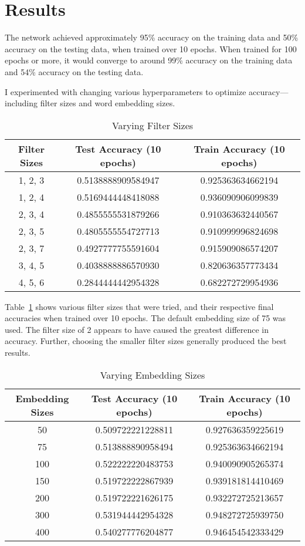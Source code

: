 \documentclass{article}
\begin{document}
\section{Results}
The network achieved approximately 95\% accuracy on the training data and 50\% accuracy on the testing data, when trained over 10 epochs. When trained
for 100 epochs or more, it would converge to around 99\% accuracy on the training data and 54\% accuracy on the testing data.

I experimented with changing various hyperparameters to optimize accuracy—including filter sizes and word embedding sizes.

\begin{table}[b]
  \caption{Varying Filter Sizes}
  \label{tab:filter_sizes}
  \centering
  \begin{tabular}{ccc}
    \toprule
    Filter Sizes & Test Accuracy (10 epochs) & Train Accuracy (10 epochs) \\
    \midrule
    1, 2, 3 & 0.5138888909584947 & 0.925363634662194 \\
    1, 2, 4 & 0.5169444448418088 & 0.936090906099839 \\
    2, 3, 4 & 0.4855555531879266 & 0.910363632440567 \\
    2, 3, 5 & 0.4805555554727713 & 0.910999996824698 \\
    2, 3, 7 & 0.4927777755591604 & 0.915909086574207 \\
    3, 4, 5 & 0.4038888886570930 & 0.820636357773434 \\
    4, 5, 6 & 0.2844444442954328 & 0.682272729954936 \\
    \bottomrule
  \end{tabular}
\end{table}

Table~\ref{tab:filter_sizes} shows various filter sizes that were tried, and their respective final accuracies when trained over 10 epochs.
The default embedding size of 75 was used.
The filter size of 2 appears to have caused the greatest difference in accuracy. Further, choosing the smaller filter sizes generally
produced the best results.

\begin{table}
  \caption{Varying Embedding Sizes}
  \label{tab:embedding_sizes}
  \centering
  \begin{tabular}{ccc}
    \toprule
    Embedding Sizes & Test Accuracy (10 epochs) & Train Accuracy (10 epochs) \\
    \midrule
    50 & 0.509722221228811 & 0.927636359225619 \\
    75 & 0.513888890958494 & 0.925363634662194 \\
    100 & 0.522222220483753 & 0.940090905265374 \\
    150 & 0.519722222867939 & 0.939181814410469 \\
    200 & 0.519722221626175 & 0.932272725213657 \\
    300 & 0.531944442954328 & 0.948272725939750 \\
    400 & 0.540277776204877 & 0.946454542333429 \\
    \bottomrule
  \end{tabular}
\end{table}
\end{document}
